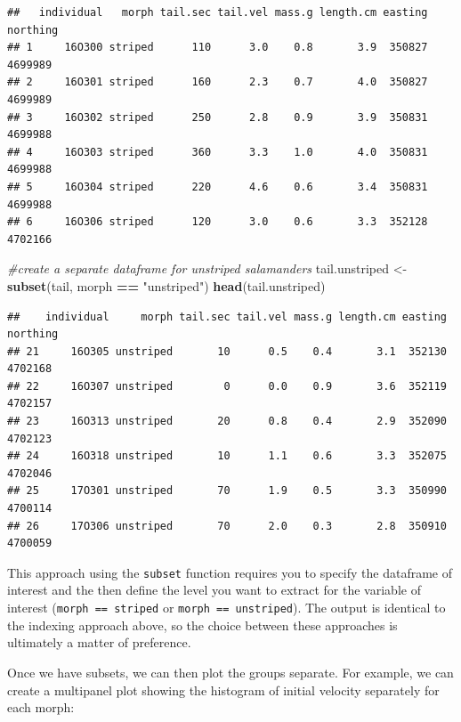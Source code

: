 \documentclass[
]{book}
\newenvironment{Shaded}{\begin{snugshade}}{\end{snugshade}}
\newcommand{\CommentTok}[1]{\textcolor[rgb]{0.56,0.35,0.01}{\textit{#1}}}
\newcommand{\FunctionTok}[1]{\textcolor[rgb]{0.13,0.29,0.53}{\textbf{#1}}}
\newcommand{\NormalTok}[1]{#1}
\newcommand{\OtherTok}[1]{\textcolor[rgb]{0.56,0.35,0.01}{#1}}
\newcommand{\SpecialCharTok}[1]{\textcolor[rgb]{0.81,0.36,0.00}{\textbf{#1}}}
\newcommand{\StringTok}[1]{\textcolor[rgb]{0.31,0.60,0.02}{#1}}
\begin{document}
\begin{verbatim}
##   individual   morph tail.sec tail.vel mass.g length.cm easting northing
## 1     16O300 striped      110      3.0    0.8       3.9  350827  4699989
## 2     16O301 striped      160      2.3    0.7       4.0  350827  4699989
## 3     16O302 striped      250      2.8    0.9       3.9  350831  4699988
## 4     16O303 striped      360      3.3    1.0       4.0  350831  4699988
## 5     16O304 striped      220      4.6    0.6       3.4  350831  4699988
## 6     16O306 striped      120      3.0    0.6       3.3  352128  4702166
\end{verbatim}

\begin{Shaded}
\begin{Highlighting}[]
\CommentTok{\#create a separate dataframe for unstriped salamanders}
\NormalTok{tail.unstriped }\OtherTok{\textless{}{-}} \FunctionTok{subset}\NormalTok{(tail, morph }\SpecialCharTok{==} \StringTok{"unstriped"}\NormalTok{)}
\FunctionTok{head}\NormalTok{(tail.unstriped)}
\end{Highlighting}
\end{Shaded}

\begin{verbatim}
##    individual     morph tail.sec tail.vel mass.g length.cm easting northing
## 21     16O305 unstriped       10      0.5    0.4       3.1  352130  4702168
## 22     16O307 unstriped        0      0.0    0.9       3.6  352119  4702157
## 23     16O313 unstriped       20      0.8    0.4       2.9  352090  4702123
## 24     16O318 unstriped       10      1.1    0.6       3.3  352075  4702046
## 25     17O301 unstriped       70      1.9    0.5       3.3  350990  4700114
## 26     17O306 unstriped       70      2.0    0.3       2.8  350910  4700059
\end{verbatim}

This approach using the \texttt{subset} function requires you to specify the dataframe of interest and the then define the level you want to extract for the variable of interest (\texttt{morph\ ==\ striped} or \texttt{morph\ ==\ unstriped}). The output is identical to the indexing approach above, so the choice between these approaches is ultimately a matter of preference.

Once we have subsets, we can then plot the groups separate. For example, we can create a multipanel plot showing the histogram of initial velocity separately for each morph:
\end{document}

